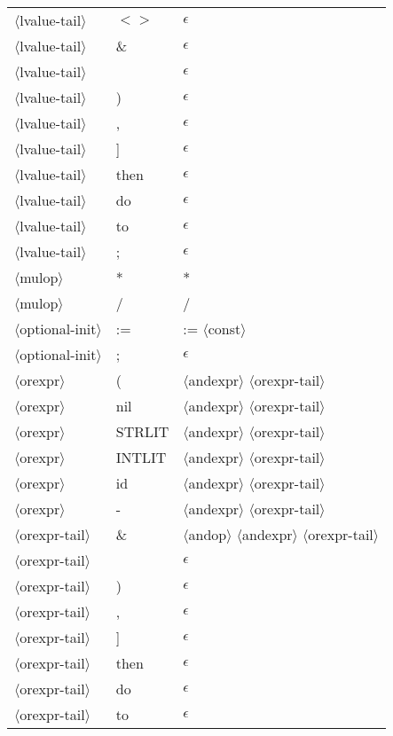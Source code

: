 \documentclass[11pt, fleqn]{article}
\newcommand{\atag}[1]{$\langle$#1$\rangle$}
\begin{document}
\begin{longtable}{l|l|l}
\atag{lvalue-tail}				&	$<>$		&	$\epsilon$											\\
\atag{lvalue-tail}				&	\&		&	$\epsilon$											\\
\atag{lvalue-tail}				&	\textbar		&	$\epsilon$											\\
\atag{lvalue-tail}				&	)		&	$\epsilon$											\\
\atag{lvalue-tail}				&	,		&	$\epsilon$											\\
\atag{lvalue-tail}				&	]		&	$\epsilon$											\\
\atag{lvalue-tail}				&	then		&	$\epsilon$											\\
\atag{lvalue-tail}				&	do		&	$\epsilon$											\\
\atag{lvalue-tail}				&	to		&	$\epsilon$											\\
\atag{lvalue-tail}				&	;		&	$\epsilon$											\\
\atag{mulop}						&	*		&	*													\\
\atag{mulop}						&	/		&	/													\\
\atag{optional-init}				&	:=		&	:= \atag{const}	\\
\atag{optional-init}				&	;		& $\epsilon$		\\
\atag{orexpr} 					&	(			&	\atag{andexpr} \atag{orexpr-tail}	\\
\atag{orexpr} 					&	nil			&	\atag{andexpr} \atag{orexpr-tail}	\\
\atag{orexpr} 					&	STRLIT			&	\atag{andexpr} \atag{orexpr-tail}	\\
\atag{orexpr} 					&	INTLIT			&	\atag{andexpr} \atag{orexpr-tail}	\\
\atag{orexpr} 					&	id			&\atag{andexpr} \atag{orexpr-tail}		\\
\atag{orexpr} 					&	-			&	\atag{andexpr} \atag{orexpr-tail}	\\
\atag{orexpr-tail}				&	\& 		&	\atag{andop} \atag{andexpr} \atag{orexpr-tail}	\\
\atag{orexpr-tail}				&	 \textbar		&	$\epsilon$	\\
\atag{orexpr-tail}				&	 )		&	$\epsilon$	\\
\atag{orexpr-tail}				&	 ,		&	$\epsilon$	\\
\atag{orexpr-tail}				&	 ]		&	$\epsilon$	\\
\atag{orexpr-tail}				&	 then		&	$\epsilon$	\\
\atag{orexpr-tail}				&	 do		&	$\epsilon$	\\
\atag{orexpr-tail}				&	 to		&	$\epsilon$	\\

\end{longtable}
\end{document}
